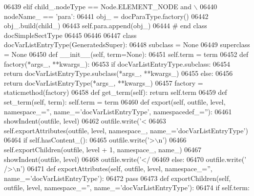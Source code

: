 \begin{DoxyCode}
{{{{{{{{{{{{{{{{{{{{{{{{{{{{{{{{{{{{{{{{{{{{{{{{{{{{{{{{{{{{{{{{{{{{{{{{{{{{{{{{{{{{{{{{{{{{{{{{{{{{{{{{{{{{{{{{{{{{{{{{{{{{{{{{{{{{{{{{{{{{{{{{{{{{{{{{{{{{{{{{{{{{{{{{{{{{{{{{{{{{{{{{{{{{{{{{{{{{{{{{{{{{{{{{{{{{{{{{{{{{{{{{{{{{{{{{{{{{{{{{{{{{{{{{{{{{{{{{{{{{{{{{{{{{{{{{{{{{{{{{{{{{{{{{{{{{{{{{{{{{{{{{{{{{{{{{{{{{{{{{{{{{{{{{{{{{{{{{{{{{{{{{{{{{{{{{{{{{{{{{{{{{{{{{{{{{{{{{{{{{{{{{{{{{{{{{{{{{06439         \textcolor{keywordflow}{elif} child\_.nodeType == Node.ELEMENT\_NODE \textcolor{keywordflow}{and} \(\backslash\)
06440             nodeName\_ == \textcolor{stringliteral}{'para'}:
06441             obj\_ = docParaType.factory()
06442             obj\_.build(child\_)
06443             self.para.append(obj\_)
06444 \textcolor{comment}{# end class docSimpleSectType}
06445 
06446 
06447 \textcolor{keyword}{class }docVarListEntryType(GeneratedsSuper):
06448     subclass = \textcolor{keywordtype}{None}
06449     superclass = \textcolor{keywordtype}{None}
06450     \textcolor{keyword}{def }__init__(self, term=None):
06451         self.term = term
06452     \textcolor{keyword}{def }factory(*args\_, **kwargs\_):
06453         \textcolor{keywordflow}{if} docVarListEntryType.subclass:
06454             \textcolor{keywordflow}{return} docVarListEntryType.subclass(*args\_, **kwargs\_)
06455         \textcolor{keywordflow}{else}:
06456             \textcolor{keywordflow}{return} docVarListEntryType(*args\_, **kwargs\_)
06457     factory = staticmethod(factory)
06458     \textcolor{keyword}{def }get_term(self): \textcolor{keywordflow}{return} self.term
06459     \textcolor{keyword}{def }set_term(self, term): self.term = term
06460     \textcolor{keyword}{def }export(self, outfile, level, namespace\_='', name\_='docVarListEntryType', namespacedef\_=''):
06461         showIndent(outfile, level)
06462         outfile.write(\textcolor{stringliteral}{'<%
06463         self.exportAttributes(outfile, level, namespace\_, name\_=\textcolor{stringliteral}{'docVarListEntryType'})
06464         \textcolor{keywordflow}{if} self.hasContent_():
06465             outfile.write(\textcolor{stringliteral}{'>\(\backslash\)n'})
06466             self.exportChildren(outfile, level + 1, namespace\_, name\_)
06467             showIndent(outfile, level)
06468             outfile.write(\textcolor{stringliteral}{'</%
06469         \textcolor{keywordflow}{else}:
06470             outfile.write(\textcolor{stringliteral}{' />\(\backslash\)n'})
06471     \textcolor{keyword}{def }exportAttributes(self, outfile, level, namespace\_='', name\_='docVarListEntryType'):
06472         \textcolor{keywordflow}{pass}
06473     \textcolor{keyword}{def }exportChildren(self, outfile, level, namespace\_='', name\_='docVarListEntryType'):
06474         \textcolor{keywordflow}{if} self.term:
}}}}}}}}}}}}}}}}}}}}}}}}}}}}}}}}}}}}}}}}}}}}}}}}}}}}}}}}}}}}}}}}}}}}}}}}}}}}}}}}}}}}}}}}}}}}}}}}}}}}}}}}}}}}}}}}}}}}}}}}}}}}}}}}}}}}}}}}}}}}}}}}}}}}}}}}}}}}}}}}}}}}}}}}}}}}}}}}}}}}}}}}}}}}}}}}}}}}}}}}}}}}}}}}}}}}}}}}}}}}}}}}}}}}}}}}}}}}}}}}}}}}}}}}}}}}}}}}}}}}}}}}}}}}}}}}}}}}}}}}}}}}}}}}}}}}}}}}}}}}}}}}}}}}}}}}}}}}}}}}}}}}}}}}}}}}}}}}}}}}}}}}}}}}}}}}}}}}}}}}}}}}}}}}}}}}}}}}}}}}}}}}}}}}}}}}}}}}}}
\end{DoxyCode}
